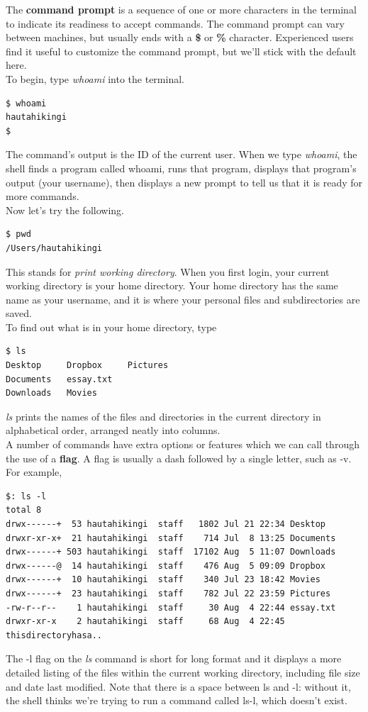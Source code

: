 \documentclass{article}
\begin{document}
The \textbf{command prompt} is a sequence of one or more characters in the terminal to indicate its readiness to accept commands. The command prompt can vary between machines, but usually ends with a \textbf{\$} or \textbf{\%} character. Experienced users find it useful to customize the command  prompt, but we'll stick with the default here.\\

To begin, type \emph{whoami} into the terminal.
\begin{lstlisting}
$ whoami
hautahikingi
$ 
\end{lstlisting}
The command's output is the ID of the current user. When we type \emph{whoami}, the shell finds a program called whoami, runs that program, displays that program's output (your username), then displays a new prompt to tell us that it is ready for more commands.\\

Now let's try the following.
\begin{lstlisting}
$ pwd
/Users/hautahikingi
\end{lstlisting}
This stands for \emph{print working directory}. When you first login, your current working directory is your home directory. Your home directory has the same name as your username, and it is where your personal files and subdirectories are saved.\\

To find out what is in your home directory, type
\begin{lstlisting}
$ ls				
Desktop		Dropbox		Pictures
Documents	essay.txt	
Downloads	Movies
\end{lstlisting}
\emph{ls} prints the names of the files and directories in the current directory in alphabetical order, arranged neatly into columns.\\

A number of commands have extra options or features which we can call through the use of a \textbf{flag}. A flag is usually a dash followed by a single letter, such as -v. For example,
\begin{lstlisting}[frame=single]
$: ls -l
total 8
drwx------+  53 hautahikingi  staff   1802 Jul 21 22:34 Desktop
drwxr-xr-x+  21 hautahikingi  staff    714 Jul  8 13:25 Documents
drwx------+ 503 hautahikingi  staff  17102 Aug  5 11:07 Downloads
drwx------@  14 hautahikingi  staff    476 Aug  5 09:09 Dropbox
drwx------+  10 hautahikingi  staff    340 Jul 23 18:42 Movies
drwx------+  23 hautahikingi  staff    782 Jul 22 23:59 Pictures
-rw-r--r--    1 hautahikingi  staff     30 Aug  4 22:44 essay.txt
drwxr-xr-x    2 hautahikingi  staff     68 Aug  4 22:45 thisdirectoryhasa..
\end{lstlisting}
The -l flag on the \emph{ls} command is short for long format and it displays a more detailed listing of the files within the current working directory, including file size and date last modified. Note that there is a space between ls and -l: without it, the shell thinks we're trying to run a command called ls-l, which doesn't exist.\\
\end{document}
